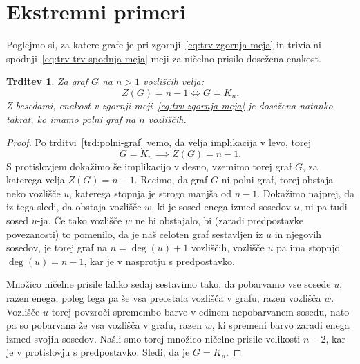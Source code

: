 \documentclass[12pt,a4paper,twoside]{article}
\theoremstyle{definition} %
\theoremstyle{plain} %
\newtheorem{trditev}[definicija]{Trditev}
\numberwithin{equation}{section}  %
\begin{document}
\section{Ekstremni primeri}
Poglejmo si, za katere grafe je pri zgornji~\eqref{eq:trv-zgornja-meja} in trivialni spodnji~\eqref{eq:trv-trv-spodnja-meja} meji za ničelno prisilo dosežena enakost. 
\begin{trditev}
    Za graf $G$ na $n > 1$ vozliščih velja:
    \[ Z(G) = n - 1 \iff G = K_n .\]
    Z besedami, enakost v zgornji meji~\eqref{eq:trv-zgornja-meja} je dosežena natanko takrat, ko imamo polni graf na $n$ vozliščih.
\end{trditev}
\begin{proof}
    Po trditvi~\ref{trd:polni-graf} vemo, da velja implikacija v levo, torej
    \[ G = K_n \implies Z(G) = n-1. \]
    S protislovjem dokažimo še implikacijo v desno, vzemimo torej graf $G$, za katerega velja $Z(G) = n-1$. Recimo, da graf $G$ ni polni graf, torej obstaja neko vozlišče $u$, katerega stopnja je strogo manjša od $n-1$. 
    Dokažimo najprej, da iz tega sledi, da obstaja vozlišče $w$, ki je sosed enega izmed sosedov $u$, ni pa tudi sosed $u$-ja. Če tako vozlišče $w$ ne bi obstajalo, bi (zaradi predpostavke povezanosti) to pomenilo, da je naš celoten graf sestavljen iz $u$ in njegovih sosedov, je torej graf na $n = \deg(u) + 1$ vozliščih, vozlišče $u$ pa ima stopnjo $\deg(u) = n-1$, kar je v nasprotju s predpostavko.
    
    Množico ničelne prisile lahko sedaj sestavimo tako, da pobarvamo vse sosede $u$, razen enega, poleg tega pa še vsa preostala vozlišča v grafu, razen vozlišča $w$. Vozlišče $u$ torej povzroči spremembo barve v edinem nepobarvanem sosedu, nato pa so pobarvana že vsa vozlišča v grafu, razen $w$, ki spremeni barvo zaradi enega izmed svojih sosedov. Našli smo torej množico ničelne prisile velikosti $n-2$, kar je v protislovju s predpostavko. Sledi, da je $G = K_n$. 
\end{proof}
\end{document}
